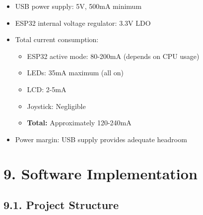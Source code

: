 \documentclass[12pt]{article}
\begin{document}
\begin{itemize}
    \item USB power supply: 5V, 500mA minimum
    \item ESP32 internal voltage regulator: 3.3V LDO
    \item Total current consumption:
    \begin{itemize}
        \item ESP32 active mode: 80-200mA (depends on CPU usage)
        \item LEDs: 35mA maximum (all on)
        \item LCD: 2-5mA
        \item Joystick: Negligible
        \item \textbf{Total:} Approximately 120-240mA
    \end{itemize}
    \item Power margin: USB supply provides adequate headroom
\end{itemize}



\section*{9. Software Implementation}

\subsection*{9.1. Project Structure}
\end{document}
